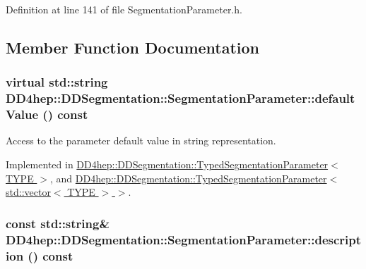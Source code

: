 Definition at line 141 of file SegmentationParameter.h.

\subsection{Member Function Documentation}
\hypertarget{class_d_d4hep_1_1_d_d_segmentation_1_1_segmentation_parameter_a2ef4dee84f8c9172aca49908c8fff136}{
\subsubsection[{defaultValue}]{\setlength{\rightskip}{0pt plus 5cm}virtual std::string DD4hep::DDSegmentation::SegmentationParameter::defaultValue () const}}
\label{class_d_d4hep_1_1_d_d_segmentation_1_1_segmentation_parameter_a2ef4dee84f8c9172aca49908c8fff136}


Access to the parameter default value in string representation. 

Implemented in \hyperlink{class_d_d4hep_1_1_d_d_segmentation_1_1_typed_segmentation_parameter_ad3c9449bad6d6516505d1677e548f251}{DD4hep::DDSegmentation::TypedSegmentationParameter$<$ TYPE $>$}, and \hyperlink{class_d_d4hep_1_1_d_d_segmentation_1_1_typed_segmentation_parameter_3_01std_1_1vector_3_01_t_y_p_e_01_4_01_4_a215047577378f5ffd7e92c5f19452cd2}{DD4hep::DDSegmentation::TypedSegmentationParameter$<$ std::vector$<$ TYPE $>$ $>$}.\hypertarget{class_d_d4hep_1_1_d_d_segmentation_1_1_segmentation_parameter_a0aca8833764992b4418728ec7c75b421}{
\subsubsection[{description}]{\setlength{\rightskip}{0pt plus 5cm}const std::string\& DD4hep::DDSegmentation::SegmentationParameter::description () const}}
\label{class_d_d4hep_1_1_d_d_segmentation_1_1_segmentation_parameter_a0aca8833764992b4418728ec7c75b421}


